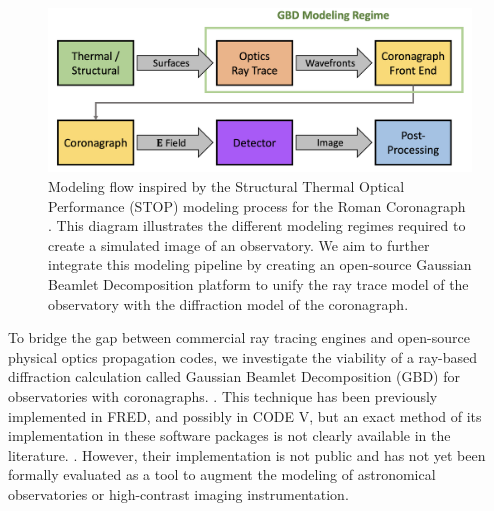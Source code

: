 \begin{figure}[H]
	\centering
	\includegraphics[width=\textwidth]{modeling_flow.png}
	\caption{Modeling flow inspired by the Structural Thermal Optical Performance (STOP) modeling process for the Roman Coronagraph \cite{Krist18}. This diagram illustrates the different modeling regimes required to create a simulated image of an observatory. We aim to further integrate this modeling pipeline by creating an open-source Gaussian Beamlet Decomposition platform to unify the ray trace model of the observatory with the diffraction model of the coronagraph.}
    \label{fig:modeling_flow}
\end{figure} 

To bridge the gap between commercial ray tracing engines and open-source physical optics propagation codes, we investigate the viability of a ray-based diffraction calculation called Gaussian Beamlet Decomposition (GBD) for  observatories with coronagraphs. . This technique has been previously implemented in FRED\cite{modeling_coherence_fred,Harvey15}, and possibly in CODE V\cite{bsp_in_codev}, but an exact method of its implementation in these software packages is not clearly available in the literature. \cite{Worku17,Worku:18,Worku19}. However, their implementation is not public and has not yet been formally evaluated as a tool to augment the modeling of astronomical observatories or high-contrast imaging instrumentation. 

